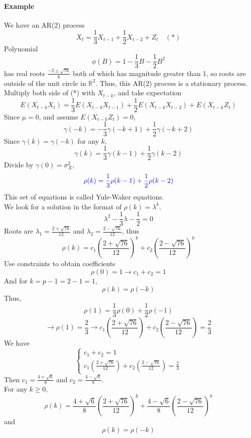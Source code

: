 \documentclass[11pt]{article}
\newcommand{\real}[0]{\mathbb{R}}
\begin{document}
\paragraph{Example}
We have an AR(2) process
$$X_t = \frac{1}{3}X_{t-1} + \frac{1}{2}X_{t-2} + Z_t \quad(*)$$
Polynomial
$$\phi(B) = 1 - \frac{1}{3}B - \frac{1}{2}B^2$$
has real roots $\frac{-2 \pm \sqrt{76}}{6}$ both of which has magnitude greater than 1, so roots are outside of the unit circle in $\real^2$. Thus, this AR(2) process is a stationary process.\\
Multiply both side of (*) with $X_{t-k}$, and take expectation
$$E(X_{t-k}X_t) = \frac{1}{3}E(X_{t-k}X_{t-1}) + \frac{1}{2}E(X_{t-k}X_{t-2}) + E(X_{t-k}Z_t)$$
Since $\mu = 0$, and assume $E(X_{t-k}Z_t) = 0$,
$$\gamma(-k) = -\frac{1}{3}\gamma(-k + 1) + \frac{1}{2}\gamma(-k + 2)$$
Since $\gamma(k) = \gamma(-k)$ for any $k$,
$$\gamma(k) = \frac{1}{3}\gamma(k-1) + \frac{1}{2}\gamma(k-2)$$
Divide by $\gamma(0) = \sigma_X^2$,
$$\textcolor{blue}{\rho(k) = \frac{1}{3}\rho(k-1) + \frac{1}{2}\rho(k-2)}$$
This set of equations is called Yule-Waker equations.\\
We look for a solution in the format of $\rho(k) = \lambda^k$.
$$\lambda^2 - \frac{1}{3}\lambda - \frac{1}{2} = 0$$
Roots are $\lambda_1 = \frac{2 + \sqrt{76}}{12}$ and $\lambda_2 = \frac{2 - \sqrt{76}}{12}$, thus
$$\rho(k) = c_1(\frac{2 + \sqrt{76}}{12})^k + c_2(\frac{2 - \sqrt{76}}{12})^k$$
Use constraints to obtain coefficients
$$\rho(0) = 1 \rightarrow c_1 + c_2 = 1$$
And for $k = p - 1 = 2 - 1 = 1$, 
$$\rho(k) = \rho(-k)$$
Thus,
$$\rho(1) = \frac{1}{3}\rho(0) + \frac{1}{2}\rho(-1)$$
$$\rightarrow \rho(1) = \frac{2}{3} \rightarrow c_1(\frac{2 + \sqrt{76}}{12}) + c_2(\frac{2 - \sqrt{76}}{12}) = \frac{2}{3}$$
We have
$$\begin{cases}
	c_1 + c_2 = 1 \\
    c_1(\frac{2 + \sqrt{76}}{12}) + c_2(\frac{2 - \sqrt{76}}{12}) = \frac{2}{3}
\end{cases}$$
Then $c_1 = \frac{4 + \sqrt{6}}{8}$ and $c_2 = \frac{4 - \sqrt{6}}{8}$. \\
For any $k \geq 0$,
$$\rho(k) = \frac{4 + \sqrt{6}}{8}(\frac{2 + \sqrt{76}}{12})^k + \frac{4 - \sqrt{6}}{8}(\frac{2 - \sqrt{76}}{12})^k$$
and
$$\rho(k) = \rho(-k)$$
\end{document}
